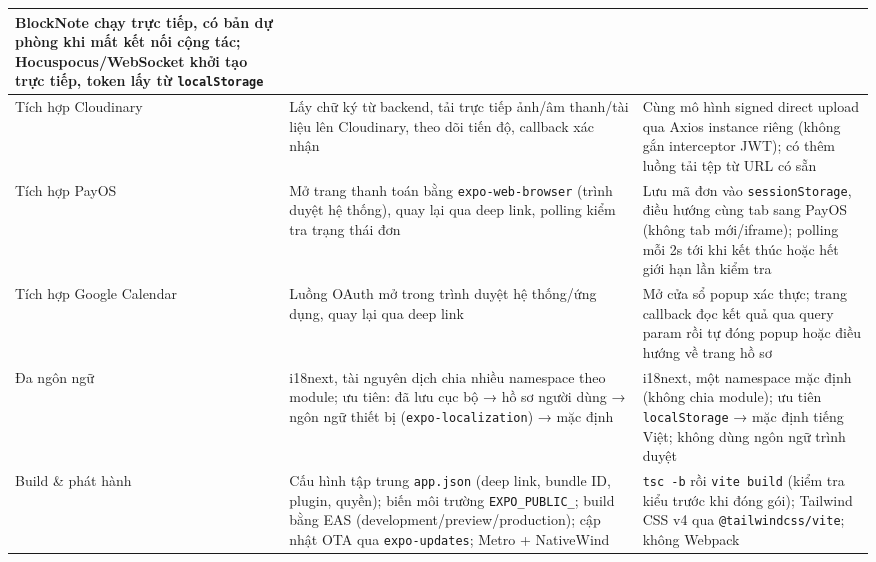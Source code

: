 \begin{singlespace}
\begin{longtable}{|>{\raggedright\arraybackslash}p{2.6cm}|>{\raggedright\arraybackslash}p{6.2cm}|>{\raggedright\arraybackslash}p{6.2cm}|}
BlockNote chạy trực tiếp, có bản dự phòng khi mất kết nối cộng tác; Hocuspocus/WebSocket khởi tạo trực tiếp, token lấy từ \texttt{localStorage} \\
\hline
Tích hợp Cloudinary &
Lấy chữ ký từ backend, tải trực tiếp ảnh/âm thanh/tài liệu lên Cloudinary, theo dõi tiến độ, callback xác nhận &
Cùng mô hình signed direct upload qua Axios instance riêng (không gắn interceptor JWT); có thêm luồng tải tệp từ URL có sẵn \\
\hline
Tích hợp PayOS &
Mở trang thanh toán bằng \texttt{expo-web-browser} (trình duyệt hệ thống), quay lại qua deep link, polling kiểm tra trạng thái đơn &
Lưu mã đơn vào \texttt{sessionStorage}, điều hướng cùng tab sang PayOS (không tab mới/iframe); polling mỗi 2s tới khi kết thúc hoặc hết giới hạn lần kiểm tra \\
\hline
Tích hợp Google Calendar &
Luồng OAuth mở trong trình duyệt hệ thống/ứng dụng, quay lại qua deep link &
Mở cửa sổ popup xác thực; trang callback đọc kết quả qua query param rồi tự đóng popup hoặc điều hướng về trang hồ sơ \\
\hline
Đa ngôn ngữ &
i18next, tài nguyên dịch chia nhiều namespace theo module; ưu tiên: đã lưu cục bộ → hồ sơ người dùng → ngôn ngữ thiết bị (\texttt{expo-localization}) → mặc định &
i18next, một namespace mặc định (không chia module); ưu tiên \texttt{localStorage} → mặc định tiếng Việt; không dùng ngôn ngữ trình duyệt \\
\hline
Build \& phát hành &
Cấu hình tập trung \texttt{app.json} (deep link, bundle ID, plugin, quyền); biến môi trường \texttt{EXPO\_PUBLIC\_}; build bằng EAS (development/preview/production); cập nhật OTA qua \texttt{expo-updates}; Metro + NativeWind &
\texttt{tsc -b} rồi \texttt{vite build} (kiểm tra kiểu trước khi đóng gói); Tailwind CSS v4 qua \texttt{@tailwindcss/vite}; không Webpack \\
\hline
\end{longtable}
\end{singlespace}
